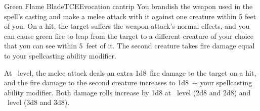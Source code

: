 \begin{spell}{Green Flame Blade}{TCE}{Evocation cantrip}
{
}
You brandish the weapon used in the spell's casting and make
a melee attack with it against one creature within 5 feet of
you. On a hit, the target suffers the weapon attack's normal
effects, and you can cause green fire to leap from the target
to a different creature of your choice that you can see within
5~feet of it. The second creature takes fire damage equal to
your spellcasting ability modifier.

 At ~level, the melee attack deals
an extra 1d8~fire damage to the target on a hit, and the fire
damage to the second creature increases to 1d8~+ your spellcasting
ability modifier. Both damage rolls increase by 1d8 at ~level
(2d8 and 2d8) and ~level (3d8 and 3d8).
\end{spell}